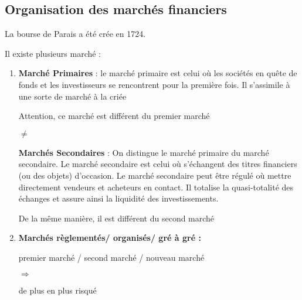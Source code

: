 \documentclass{report}
\begin{document}
\subsection{Organisation des marchés financiers}

La bourse de Parais a été crée en 1724.

\startchronology[startyear=1980,stopyear=2021]
\stopchronology

\vspace{2.5cm}
Il existe plusieurs marché :
\begin{enumerate}
    \item \textbf{Marché Primaires} : le marché primaire est celui où les sociétés en quête de fonds et les investisseurs se rencontrent pour la première fois. Il s’assimile à une sorte de marché à la criée
    
    Attention, ce marché est différent du premier marché
    \begin{center}
    \LARGE
        $\ne$
    \end{center}
    \textbf{Marchés Secondaires} : On distingue le marché primaire du marché secondaire. Le marché secondaire est celui où s'échangent des titres financiers (ou des objets) d’occasion. Le marché secondaire peut être régulé où mettre directement vendeurs et acheteurs en contact. Il totalise la quasi-totalité des échanges et assure ainsi la liquidité des investissements.
    
    De la même manière, il est différent du second marché
    
    
    \item \textbf{Marchés règlementés/ organisés/ gré à gré :} 
    
    \begin{center}
    premier marché / second marché / nouveau marché
    
    $\Longrightarrow$
    
    de plus en plus risqué
    \end{center}
\end{enumerate}
\end{document}
